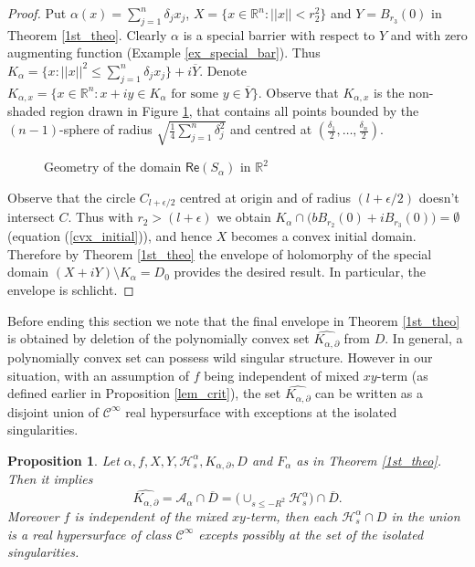 \documentclass[12pt,reqno, a4paper]{amsart}
\newtheorem{proposition}[theorem]{Proposition}
\theoremstyle{definition}
\theoremstyle{definition}
\numberwithin{equation}{section}
\def\R{\mathbb{R}}                              %
\def\eps{\epsilon}
\begin{document}
\begin{proof}
	Put $\alpha(x)=\sum_{j=1}^{n}\delta_jx_j$, $X=\{x\in \R^n: ||x||<r_2^2\}$ and $Y=B_{r_3}(0)$ in Theorem \ref{1st_theo}. Clearly $\alpha$ is a special barrier with respect to $Y$ and with zero augmenting function (Example \ref{ex_special_bar}). Thus  ${K_{\alpha} = \{x: ||x||^2\leq \sum_{j=1}^{n}\delta_jx_j\}+i\overline{Y}}$. Denote $K_{\alpha,x}=\{x\in \R^n: x+iy \in K_{\alpha} \text{ for some } y\in \overline{Y}\}.$ Observe that $K_{\alpha,x}$ is the non-shaded region drawn in Figure \ref{ex_circles}, that contains all points bounded by the $(n-1)$-sphere of radius $\sqrt{\frac{1}{4}{\sum_{j=1}^{n}\delta_j^2}}$ and centred at $(\frac{\delta_1}{2},\ldots, \frac{\delta_n}{2})$.	
	\begin{figure}[!htb]
		\centering
		\vspace*{-3.8cm}
		\def\svgwidth{\linewidth}
		\fontsize{11pt}{1em}
		\scalebox{.75}{}
		\vspace*{-5.4cm}
		\caption{Geometry of the domain $\textsf{Re}(S_{\alpha})$ in $\R^2$}
		\label{ex_circles}
	\end{figure}	
	Observe that the circle $C_{l+\eps/2}$ centred at origin and of radius $(l+\eps/2)$ doesn't intersect $C$. Thus with $r_2>(l+\eps)$ we obtain $ {K_{\alpha} \cap \big(b B_{r_2}(0)+iB_{r_3}(0)\big) =\emptyset}$ (equation (\ref{cvx_initial})), and hence $X$ becomes a convex initial domain. Therefore by Theorem \ref{1st_theo} the envelope of holomorphy of the special domain $(X+iY)\setminus K_{\alpha}=D_0$
	provides the desired result. In particular, the envelope is schlicht.
\end{proof}
	
Before ending this section we note that the final envelope in Theorem \ref{1st_theo} is obtained by deletion of the polynomially convex set $\widehat{K_{\alpha,\partial}}$ from $D.$ In general, a polynomially convex set can possess wild singular structure. However in our situation, with an assumption of $f$ being independent of mixed $xy$-term (as defined earlier in Proposition \ref{lem_crit}), the set $\widehat{K_{\alpha,\partial}}$ can be written as a disjoint union of $\mathcal{C}^{\infty}$ real hypersurface with exceptions at the isolated singularities.

\begin{proposition}\label{lem_crit2}
	Let $\alpha, f, X, Y, \mathcal{H}_{s}^{\alpha},K_{\alpha, \partial}, D $ and $F_{\alpha}$ as in Theorem \ref{1st_theo}. Then it implies 
	\begin{equation}\label{s-R2}
	\widehat{K_{\alpha, \partial}}=\mathcal{A}_{\alpha}\cap \overline{D}=\Big(\cup_{s\leq -R^2}\mathcal{H}_{s}^{\alpha}\Big)\cap \overline{D}.
	\end{equation}
Moreover $f$ is independent of the mixed $xy$-term, then each $\mathcal{H}_{s}^{\alpha} \cap D$ in the union is a real hypersurface of class $\mathcal{C}^{\infty}$ excepts possibly at the set of the isolated singularities.
\end{proposition}
\end{document}
